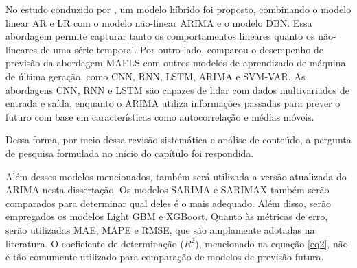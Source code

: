 No estudo conduzido por , um modelo híbrido foi proposto, combinando o modelo linear AR e LR com o modelo não-linear ARIMA e o modelo DBN. Essa abordagem permite capturar tanto os comportamentos lineares quanto os não-lineares de uma série temporal. Por outro lado,  comparou o desempenho de previsão da abordagem MAELS com outros modelos de aprendizado de máquina de última geração, como CNN, RNN, LSTM, ARIMA e SVM-VAR. As abordagens CNN, RNN e LSTM são capazes de lidar com dados multivariados de entrada e saída, enquanto o ARIMA utiliza informações passadas para prever o futuro com base em características como autocorrelação e médias móveis.

Dessa forma, por meio dessa revisão sistemática e análise de conteúdo, a pergunta de pesquisa formulada no início do capítulo foi respondida.

Além desses modelos mencionados, também será utilizada a versão atualizada do ARIMA nesta dissertação. Os modelos SARIMA e SARIMAX também serão comparados para determinar qual deles é o mais adequado. Além disso, serão empregados os modelos Light GBM e XGBoost. Quanto às métricas de erro, serão utilizadas MAE, MAPE e RMSE, que são amplamente adotadas na literatura. O coeficiente de determinação ($R^2$), mencionado na equação \eqref{eq2}, não é tão comumente utilizado para comparação de modelos de previsão futura.
